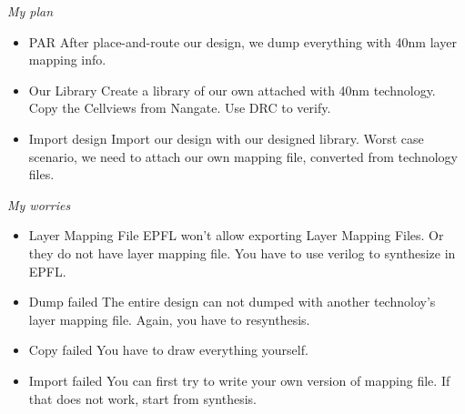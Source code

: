 \documentclass[]{article}
\begin{document}
\textit{My plan}
\indent     \begin{itemize}
            \item {PAR} After place-and-route our design, we dump everything with
            40nm layer mapping info.
            \item {Our Library} Create a library of our own attached with 40nm
            technology. Copy the Cellviews from Nangate. Use DRC to verify.
            \item {Import design} Import our design with our designed library.
            Worst case scenario, we need to attach our own mapping file,
            converted from technology files.
        \end{itemize}

\textit{My worries}
\indent     \begin{itemize}
            \item {Layer Mapping File} EPFL won't allow exporting Layer Mapping
            Files. Or they do not have layer mapping file. You have to use
            verilog to synthesize in EPFL. 
            \item {Dump failed} The entire design can not dumped with another
            technoloy's layer mapping file. Again, you have to resynthesis.
            \item {Copy failed} You have to draw everything yourself.
            \item {Import failed} You can first try to write your own version of
            mapping file. If that does not work, start from synthesis.
            \end{itemize}
\end{document}
